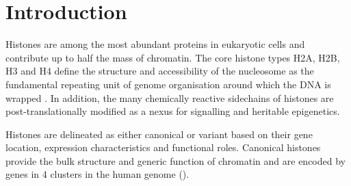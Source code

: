 \section{Introduction}

  Histones are among the most abundant proteins in eukaryotic cells 
  and contribute up to half the mass of chromatin. 
  The core histone types H2A, H2B, H3 and H4 
  define the structure and accessibility of the nucleosome 
  as the fundamental repeating unit of genome organisation 
  around which the DNA is wrapped \citep{Luger1997structure}.
  In addition, the many chemically reactive sidechains of histones 
  are post-translationally modified 
  as a nexus for signalling and heritable epigenetics.
  
  Histones are delineated as either canonical or variant based on 
  their gene location, expression characteristics and functional roles.
  Canonical histones provide the bulk structure and generic function of chromatin
  and are encoded by \TotalGenes{} genes in 4 clusters in the human genome ().

